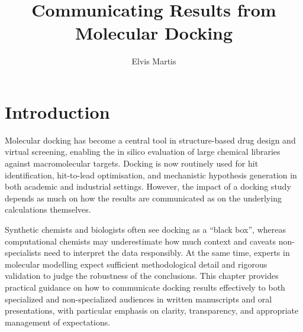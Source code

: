 \documentclass[12pt]{article}
\title{Communicating Results from Molecular Docking}
\author{Elvis Martis}
\begin{document}
\maketitle





\section{Introduction}

Molecular docking has become a central tool in structure-based drug design and virtual screening, enabling the in silico evaluation of large chemical libraries against macromolecular targets.\cite{CH11_Kitchen2004,CH11_Pagadala2017,CH11_Cheng2012} 
Docking is now routinely used for hit identification, hit-to-lead optimisation, and mechanistic hypothesis generation in both academic and industrial settings.\cite{CH11_Kitchen2004,CH11_Forli2015,CH11_Cheng2012} 
However, the impact of a docking study depends as much on how the results are communicated as on the underlying calculations themselves.\cite{CH11_Berry2015,CH11_Forli2015,CH11_zhu2022} 

Synthetic chemists and biologists often see docking as a ``black box'', whereas computational chemists may underestimate how much context and caveats non-specialists need to interpret the data responsibly.\cite{CH11_Berry2015,CH11_Kitchen2004,CH11_BindingAffinity2018} 
At the same time, experts in molecular modelling expect sufficient methodological detail and rigorous validation to judge the robustness of the conclusions.\cite{CH11_Warren2006,CH11_Plewczynski2011,CH11_EmpiricalScoring2018} 
This chapter provides practical guidance on how to communicate docking results effectively to both specialized and non-specialized audiences in written manuscripts and oral presentations, with particular emphasis on clarity, transparency, and appropriate management of expectations.\cite{CH11_Berry2015,CH11_Forli2015,CH11_IsItReliable2018} 
\end{document}

